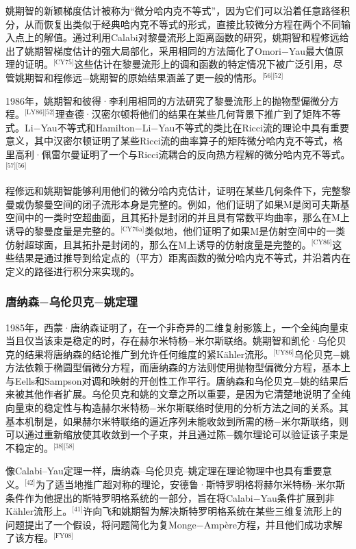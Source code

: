 姚期智的新颖梯度估计被称为“微分哈内克不等式”，因为它们可以沿着任意路径积分，从而恢复出类似于经典哈内克不等式的形式，直接比较微分方程在两个不同输入点上的解值。通过利用Calabi对黎曼流形上距离函数的研究，姚期智和程修远给出了姚期智梯度估计的强大局部化，采用相同的方法简化了Omori−Yau最大值原理的证明。\(^\text{[CY75]}\)这些估计在黎曼流形上的调和函数的特定情况下被广泛引用，尽管姚期智和程修远−姚期智的原始结果涵盖了更一般的情形。\(^\text{[56][52]}\)

1986年，姚期智和彼得·李利用相同的方法研究了黎曼流形上的抛物型偏微分方程。\(^\text{[LY86][52]}\)理查德·汉密尔顿将他们的结果在某些几何背景下推广到了矩阵不等式。Li−Yau不等式和Hamilton−Li−Yau不等式的类比在Ricci流的理论中具有重要意义，其中汉密尔顿证明了某些Ricci流的曲率算子的矩阵微分哈内克不等式，格里高利·佩雷尔曼证明了一个与Ricci流耦合的反向热方程解的微分哈内克不等式。\(^\text{[57][56]}\)

程修远和姚期智能够利用他们的微分哈内克估计，证明在某些几何条件下，完整黎曼或伪黎曼空间的闭子流形本身是完整的。例如，他们证明了如果M是闵可夫斯基空间中的一类时空超曲面，且其拓扑是封闭的并且具有常数平均曲率，那么在M上诱导的黎曼度量是完整的。\(^\text{[CY76a]}\)类似地，他们证明了如果M是仿射空间中的一类仿射超球面，且其拓扑是封闭的，那么在M上诱导的仿射度量是完整的。\(^\text{[CY86]}\)这些结果是通过推导到给定点的（平方）距离函数的微分哈内克不等式，并沿着内在定义的路径进行积分来实现的。
\subsubsection{唐纳森−乌伦贝克−姚定理}  
1985年，西蒙·唐纳森证明了，在一个非奇异的二维复射影簇上，一个全纯向量束当且仅当该束是稳定的时，存在赫尔米特杨−米尔斯联络。姚期智和凯伦·乌伦贝克的结果将唐纳森的结论推广到允许任何维度的紧Kähler流形。\(^\text{[UY86]}\)乌伦贝克−姚方法依赖于椭圆型偏微分方程，而唐纳森的方法则使用抛物型偏微分方程，基本上与Eells和Sampson对调和映射的开创性工作平行。唐纳森和乌伦贝克−姚的结果后来被其他作者扩展。乌伦贝克和姚的文章之所以重要，是因为它清楚地说明了全纯向量束的稳定性与构造赫尔米特杨−米尔斯联络时使用的分析方法之间的关系。其基本机制是，如果赫尔米特联络的逼近序列未能收敛到所需的杨−米尔斯联络，则可以通过重新缩放使其收敛到一个子束，并且通过陈−魏尔理论可以验证该子束是不稳定的。\(^\text{[38][58]}\)

像Calabi–Yau定理一样，唐纳森–乌伦贝克–姚定理在理论物理中也具有重要意义。\(^\text{[42]}\)为了适当地推广超对称的理论，安德鲁·斯特罗明格将赫尔米特杨–米尔斯条件作为他提出的斯特罗明格系统的一部分，旨在将Calabi−Yau条件扩展到非Kähler流形上。\(^\text{[41]}\)许向飞和姚期智为解决斯特罗明格系统在某些三维复流形上的问题提出了一个假设，将问题简化为复Monge−Ampère方程，并且他们成功求解了该方程。\(^\text{[FY08]}\)

